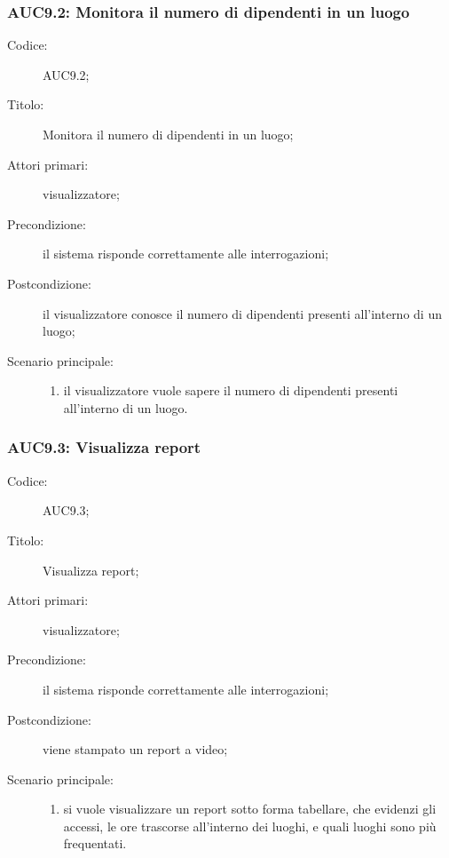 \documentclass[../../../analisi-dei-requisiti.tex]{subfiles}
\begin{document}
\subsubsection{AUC9.2: Monitora il numero di dipendenti in un luogo}%
\label{subs:AUC9.2}
\begin{description}
  \item[Codice:] AUC9.2;
  \item[Titolo:] Monitora il numero di dipendenti in un luogo;
  \item[Attori primari:] visualizzatore;
  \item[Precondizione:] il sistema risponde correttamente alle interrogazioni;
  \item[Postcondizione:] il visualizzatore conosce il numero di dipendenti presenti all'interno di un luogo;
  \item[Scenario principale:]
  \begin{enumerate}
    \item il visualizzatore vuole sapere il numero di dipendenti presenti all'interno di un luogo.
  \end{enumerate}
\end{description}

\subsubsection{AUC9.3: Visualizza report}%
\label{subs:AUC9.3}
\begin{description}
  \item[Codice:] AUC9.3;
  \item[Titolo:] Visualizza report;
  \item[Attori primari:] visualizzatore;
  \item[Precondizione:] il sistema risponde correttamente alle interrogazioni;
  \item[Postcondizione:] viene stampato un report a video;
  \item[Scenario principale:]
  \begin{enumerate}
    \item si vuole visualizzare un report sotto forma tabellare, che evidenzi gli accessi, le ore trascorse all'interno dei luoghi, e quali luoghi sono più frequentati.
  \end{enumerate}
\end{description}
\end{document}
